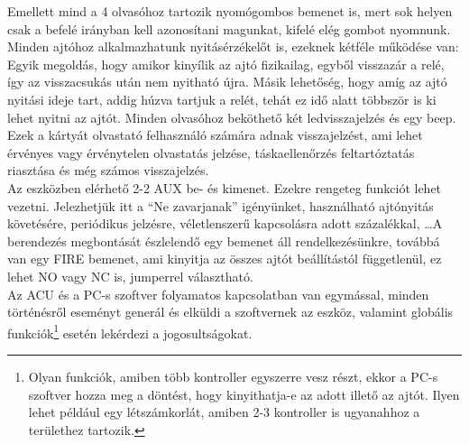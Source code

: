 \documentclass[a4paper, 12pt]{article}
\begin{document}
Emellett mind a 4 olvasóhoz tartozik nyomógombos bemenet is, mert sok helyen csak a befelé irányban kell azonosítani magunkat, kifelé elég gombot nyomnunk. Minden ajtóhoz alkalmazhatunk nyitásérzékelőt is, ezeknek kétféle működése van: Egyik megoldás, hogy amikor kinyílik az ajtó fizikailag, egyből visszazár a relé, így az visszacsukás után nem nyitható újra. Másik lehetőség, hogy amíg az ajtó nyitási ideje tart, addig húzva tartjuk a relét, tehát ez idő alatt többször is ki lehet nyitni az ajtót. Minden olvasóhoz beköthető két ledvisszajelzés és egy beep. Ezek a kártyát olvastató felhasználó számára adnak visszajelzést, ami lehet érvényes vagy érvénytelen olvastatás jelzése, táskaellenőrzés feltartóztatás riasztása és még számos visszajelzés.\\
Az eszközben elérhető 2-2 AUX be- és kimenet. Ezekre rengeteg funkciót lehet vezetni. Jelezhetjük itt a ``Ne zavarjanak'' igényünket, használható ajtónyitás követésére, periódikus jelzésre, véletlenszerű kapcsolásra adott százalékkal, \dots A berendezés megbontását észlelendő egy bemenet áll rendelkezésünkre, továbbá van egy FIRE bemenet, ami kinyitja az összes ajtót beállítástól függetlenül, ez lehet NO vagy NC is, jumperrel választható.\\
Az ACU és a PC-s szoftver folyamatos kapcsolatban van egymással, minden történésről eseményt generál és elküldi a szoftvernek az eszköz, valamint globális funkciók\footnote{Olyan funkciók, amiben több kontroller egyszerre vesz részt, ekkor a PC-s szoftver hozza meg a döntést, hogy kinyithatja-e az adott illető az ajtót. Ilyen lehet például egy létszámkorlát, amiben 2-3 kontroller is ugyanahhoz a területhez tartozik.} esetén lekérdezi a jogosultságokat.
\end{document}
